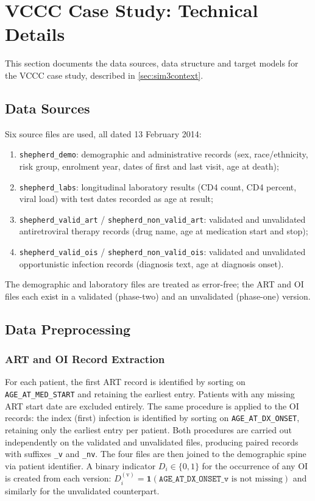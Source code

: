 \section{VCCC Case Study: Technical Details}
\label{app:vccc}

This section documents the data sources, data structure and target models for the VCCC case study, described in \ref{sec:sim3context}.

\subsection{Data Sources}
\label{app:vccc_data}

Six source files are used, all dated 13 February 2014:
\begin{enumerate}[nosep]
  \item \texttt{shepherd\_demo}: demographic and administrative records (sex, race/ethnicity, risk group, enrolment year, dates of first and last visit, age at death);
  \item \texttt{shepherd\_labs}: longitudinal laboratory results (CD4 count, CD4 percent, viral load) with test dates recorded as age at result;
  \item \texttt{shepherd\_valid\_art} / \texttt{shepherd\_non\_valid\_art}: validated and unvalidated antiretroviral therapy records (drug name, age at medication start and stop);
  \item \texttt{shepherd\_valid\_ois} / \texttt{shepherd\_non\_valid\_ois}: validated and unvalidated opportunistic infection records (diagnosis text, age at diagnosis onset).
\end{enumerate}
The demographic and laboratory files are treated as error-free; the ART and OI files each exist in a validated (phase-two) and an unvalidated (phase-one) version.

\subsection{Data Preprocessing}
\label{app:vccc_preprocessing}

\subsubsection{ART and OI Record Extraction}

For each patient, the first ART record is identified by sorting on \texttt{AGE\_AT\_MED\_START} and retaining the earliest entry. Patients with any missing ART start date are excluded entirely. The same procedure is applied to the OI records: the index (first) infection is identified by sorting on \texttt{AGE\_AT\_DX\_ONSET}, retaining only the earliest entry per patient. Both procedures are carried out independently on the validated and unvalidated files, producing paired records with suffixes \texttt{\_v} and \texttt{\_nv}. The four files are then joined to the demographic spine via patient identifier. A binary indicator $D_i \in \{0,1\}$ for the occurrence of any OI is created from each version: $D_i^{(\mathrm{v})} = \mathbf{1}(\texttt{AGE\_AT\_DX\_ONSET\_v} \text{ is not missing})$ and similarly for the unvalidated counterpart.

